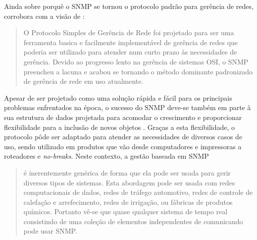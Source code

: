 \documentclass[twoside,english,brazilian]{UNISINOSmonografia}
\begin{document}
Ainda sobre porquê o SNMP se tornou o protocolo padrão para gerência de redes, 
 corrobora com a visão de :

\begin{quote}
O Protocolo Simples de Gerência de Rede foi projetado para ser uma ferramenta 
basica e facilmente implementável de gerência de redes que poderia ser 
utilizado para atender num curto prazo às necessidades de gerência. Devido ao 
progresso lento na gerência de sistemas OSI, o SNMP preencheu a lacuna e 
acabou se tornando o método dominante padronizado de gerência de rede em uso 
atualmente.
\cite[p.~83]{stallings1999snmp}
\end{quote}

Apesar de ser projetado como uma solução rápida e fácil para os principais 
problemas enfrentados na época, o sucesso do SNMP deve-se também em parte à 
sua estrutura de dados projetada para acomodar o crescimento e proporcionar 
flexibilidade para a inclusão de novos objetos \cite{stallings1999snmp}.
Graças a esta flexibilidade, o protocolo pôde ser adaptado para atender as 
necessidades de diversos casos de uso, sendo utilizado em produtos que vão 
desde computadores e impressoras a roteadores e \textit{no-breaks}.
Neste contexto, a gestão baseada em SNMP

\begin{quote}
é inerentemente genérica de forma que ela pode ser usada para gerir diversos 
tipos de sistemas. Esta abordagem pode ser usada com redes computacionais de 
dados, redes de tráfego automotivo, redes de controle de calefação e 
arrefecimento, redes de irrigação, ou fábricas de produtos químicos. Portanto 
vê-se que quase qualquer sistema de tempo real consistindo de uma coleção de 
elementos independentes de comunicando pode usar SNMP.
\cite[p.~2]{perkins1997understanding}
\end{quote}
\end{document}
